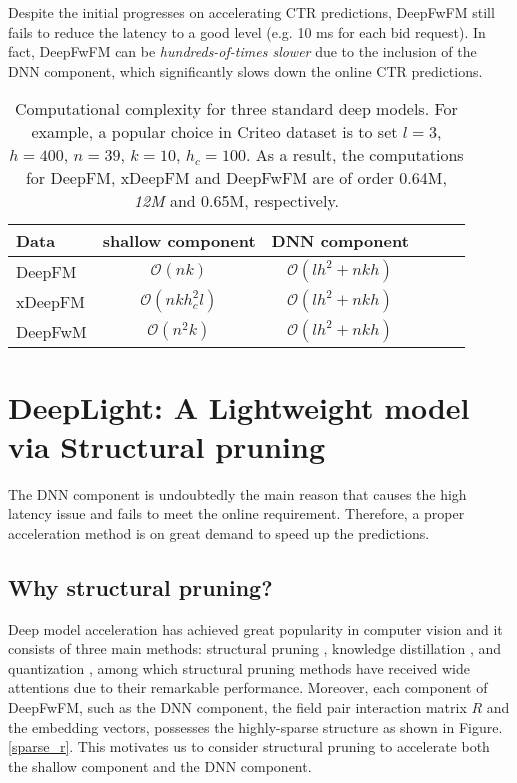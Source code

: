 \documentclass[sigconf]{acmart}
\begin{document}
Despite the initial progresses on accelerating CTR predictions, DeepFwFM still fails to reduce the latency to a good level (e.g. 10 ms for each bid request). In fact, DeepFwFM can be \emph{hundreds-of-times slower} due to the inclusion of the DNN component, which significantly slows down the online CTR predictions.

\begin{table}
 \caption{Computational complexity for three standard deep models. For example, a popular choice in Criteo dataset is to set $l=3$, $h=400$, $n=39$, $k=10$, $h_c=100$. As a result, the computations for DeepFM, xDeepFM and DeepFwFM are of order 0.64M, \emph{12M} and 0.65M, respectively.}
  \centering
  \begin{tabular}{lccccr}
    \toprule
Data     & shallow component & DNN component    \\
    \midrule
    DeepFM &  $\mathcal{O}(nk)$ & $\mathcal{O}(lh^2+nkh)$  \\
    xDeepFM & $\mathcal{O}(nkh_c^2l)$ & $\mathcal{O}(lh^2+nkh)$ \\
    DeepFwM & $\mathcal{O}(n^2k)$ & $\mathcal{O}(lh^2+nkh)$  \\
    \bottomrule
  \end{tabular}
  \label{com_complexity}
\end{table}




\section{DeepLight: A Lightweight model via Structural pruning}

The DNN component is undoubtedly the main reason that causes the high latency issue and fails to meet the online requirement. Therefore, a proper acceleration method is on great demand to speed up the predictions. 





\subsection{Why structural pruning?}



Deep model acceleration has achieved great popularity in computer vision and it consists of three main methods: structural pruning \cite{han2015learning, li17}, knowledge distillation \cite{distill}, and quantization \cite{weight_quant1}, among which structural pruning methods have received wide attentions \cite{han2015learning, hansong16, deng2019, strucprunining, deguang, ye_icml, ye_nips} due to their remarkable performance. Moreover, each component of DeepFwFM, such as the DNN component, the field pair interaction matrix $R$ and the embedding vectors, possesses the highly-sparse structure as shown in Figure.\ref{sparse_r}. This motivates us to consider structural pruning to accelerate both the shallow component and the DNN component.
 
\end{document}
